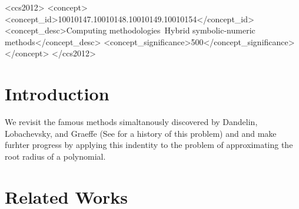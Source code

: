 \documentclass[sigconf]{acmart}
\begin{document}
\begin{CCSXML}
<ccs2012>
   <concept>
       <concept_id>10010147.10010148.10010149.10010154</concept_id>
       <concept_desc>Computing methodologies~Hybrid symbolic-numeric methods</concept_desc>
       <concept_significance>500</concept_significance>
       </concept>
 </ccs2012>
\end{CCSXML}






\maketitle

\section{Introduction}
 We revisit the famous methods simaltanously discovered by Dandelin, Lobachevsky, and Graeffe (See \cite{10.2307/2310626} for a history of this problem) and and make furhter progress by applying this indentity to the problem of approximating the root radius of a polynomial.

\section{Related Works}
\end{document}
